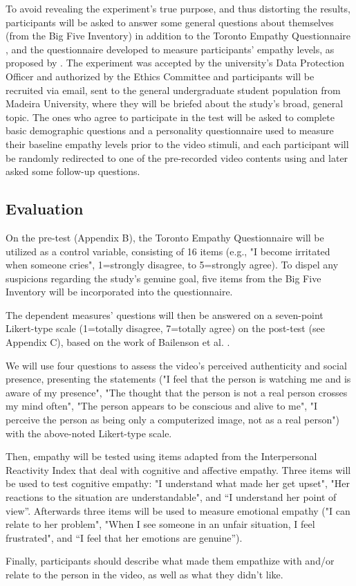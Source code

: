 To avoid revealing the experiment's true purpose, and thus distorting the results, participants will be asked to answer some general questions about themselves (from the Big Five Inventory) in addition to the Toronto Empathy Questionnaire \cite{SPR03}, and the questionnaire developed to measure participants' empathy levels, as proposed by \cite{ROT19, ZIB19}. 
The experiment was accepted by the university's Data Protection Officer and authorized by the Ethics Committee and participants will be recruited via email, sent to the general undergraduate student population from Madeira University, where they will be briefed about the study's broad, general topic.
The ones who agree to participate in the test will be asked to complete basic demographic questions and a personality questionnaire used to measure their baseline empathy levels prior to the video stimuli, and each participant will be randomly redirected to one of the pre-recorded video contents using \cite{FER19} and later asked some follow-up questions.

\subsection{Evaluation}
On the pre-test (Appendix B), the Toronto Empathy Questionnaire \cite{SPR03} will be utilized as a control variable, consisting of 16 items (e.g., "I become irritated when someone cries", 1=strongly disagree, to 5=strongly agree). To dispel any suspicions regarding the study's genuine goal, five items from the Big Five Inventory \cite{JOH91} will be incorporated into the questionnaire.

The dependent measures' questions will then be answered on a seven-point Likert-type scale (1=totally disagree, 7=totally agree) on the post-test (see Appendix C), based on the work of Bailenson et al. \cite{BAI03}.

We will use four questions to assess the video's perceived authenticity and social presence, presenting the statements ("I feel that the person is watching me and is aware of my presence", "The thought that the person is not a real person crosses my mind often", "The person appears to be conscious and alive to me", "I perceive the person as being only a computerized image, not as a real person") with the above-noted Likert-type scale.

Then, empathy will be tested using items adapted from the Interpersonal Reactivity Index \cite{DAV83} that deal with cognitive and affective empathy. Three items will be used to test cognitive empathy: "I understand what made her get upset", "Her reactions to the situation are understandable", and “I understand her point of view”. Afterwards three items will be used to measure emotional empathy ("I can relate to her problem", "When I see someone in an unfair situation, I feel frustrated", and “I feel that her emotions are genuine”).

Finally, participants should describe what made them empathize with and/or relate to the person in the video, as well as what they didn't like.

